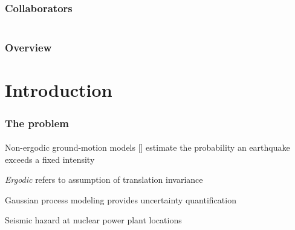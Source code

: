 \documentclass{beamer}                             %
\newenvironment{wideitemize}
  {\itemize\setlength{\itemsep}{0.5cm}}
  {\enditemize}
\begin{document}
\begin{frame}
\begin{columns}
  \end{columns}
\end{frame}

\begin{frame}
\frametitle{Collaborators}
\framesubtitle{}
\begin{columns}
\end{columns}
\end{frame}

\begin{frame}
\frametitle{Overview}
\framesubtitle{}

\tableofcontents
\end{frame}

\section{Introduction}

\begin{frame}
\frametitle{The problem}
\framesubtitle{}

\begin{wideitemize}
  \item<+-> Non-ergodic ground-motion models [\cite{lavrentiadis2022overview}]
    estimate the probability an earthquake exceeds a fixed intensity
  \item<+-> \emph{Ergodic} refers to assumption of translation invariance
  \item<+-> Gaussian process modeling provides uncertainty quantification
  \item<+-> Seismic hazard at nuclear power plant locations
\end{wideitemize}
\end{frame}
\end{document}
